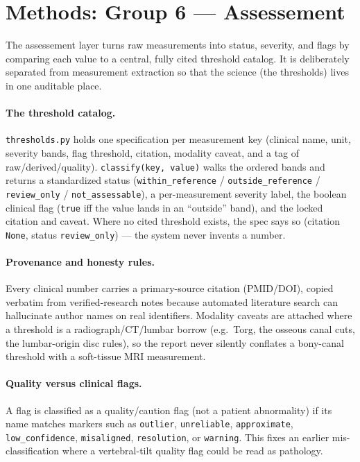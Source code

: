 \section{Methods: Group 6 --- Assessement}
\label{sec:g6}

The assessement layer turns raw measurements into status, severity, and flags by comparing each value
to a central, fully cited threshold catalog. It is deliberately separated from measurement extraction so
that the science (the thresholds) lives in one auditable place.

\paragraph{The threshold catalog.} \texttt{thresholds.py} holds one specification per measurement key
(clinical name, unit, severity bands, flag threshold, citation, modality caveat, and a tag of
raw/derived/quality). \texttt{classify(key, value)} walks the ordered bands and returns a standardized
status (\texttt{within\_reference} / \texttt{outside\_reference} / \texttt{review\_only} /
\texttt{not\_assessable}), a per-measurement severity label, the boolean clinical flag
(\texttt{true} iff the value lands in an ``outside'' band), and the locked citation and caveat. Where no
cited threshold exists, the spec says so (citation \texttt{None}, status \texttt{review\_only}) --- the
system never invents a number.

\paragraph{Provenance and honesty rules.} Every clinical number carries a primary-source citation
(PMID/DOI), copied verbatim from verified-research notes because automated literature search can
hallucinate author names on real identifiers. Modality caveats are attached where a threshold is a
radiograph/CT/lumbar borrow (e.g.\ Torg, the osseous canal cuts, the lumbar-origin disc rules), so the
report never silently conflates a bony-canal threshold with a soft-tissue MRI measurement.

\paragraph{Quality versus clinical flags.} A flag is classified as a quality/caution flag (not a patient
abnormality) if its name matches markers such as \texttt{outlier}, \texttt{unreliable},
\texttt{approximate}, \texttt{low\_confidence}, \texttt{misaligned}, \texttt{resolution}, or
\texttt{warning}. This fixes an earlier mis-classification where a vertebral-tilt quality flag could be
read as pathology.

